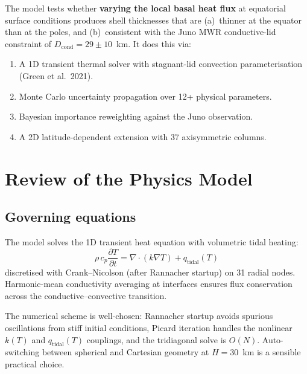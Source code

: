 \documentclass[11pt,a4paper]{article}
\begin{document}
The model tests whether \textbf{varying the local basal heat flux} at
equatorial surface conditions produces shell thicknesses that are
(a)~thinner at the equator than at the poles, and (b)~consistent with the
Juno MWR conductive-lid constraint of $D_\mathrm{cond} = 29 \pm 10$~km.
It does this via:

\begin{enumerate}[leftmargin=2em]
\item A 1D transient thermal solver with stagnant-lid convection
      parameterisation (Green et al.\ 2021).
\item Monte Carlo uncertainty propagation over 12+ physical parameters.
\item Bayesian importance reweighting against the Juno observation.
\item A 2D latitude-dependent extension with 37 axisymmetric columns.
\end{enumerate}

\section{Review of the Physics Model}

\subsection{Governing equations}

The model solves the 1D transient heat equation with volumetric tidal
heating:
\begin{equation}
\rho\, c_p \frac{\partial T}{\partial t}
  = \nabla \cdot (k \nabla T) + q_\mathrm{tidal}(T)
\label{eq:heat}
\end{equation}
discretised with Crank--Nicolson (after Rannacher startup) on 31 radial
nodes. Harmonic-mean conductivity averaging at interfaces ensures flux
conservation across the conductive--convective transition.

\begin{strength}
The numerical scheme is well-chosen: Rannacher startup avoids spurious
oscillations from stiff initial conditions, Picard iteration handles the
nonlinear $k(T)$ and $q_\mathrm{tidal}(T)$ couplings, and the tridiagonal
solve is $O(N)$. Auto-switching between spherical and Cartesian geometry
at $H = 30$~km is a sensible practical choice.
\end{strength}
\end{document}
